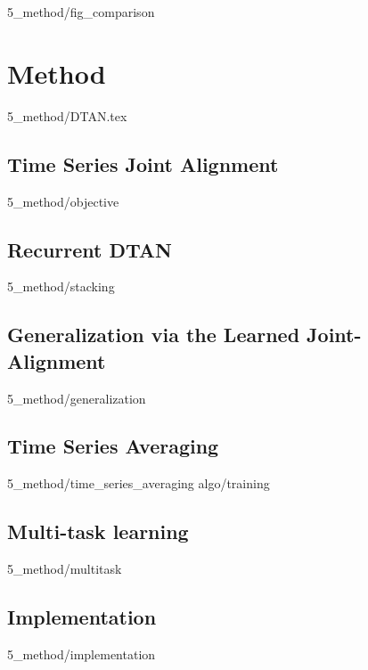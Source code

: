 {5_method/fig_comparison}
\section{Method}\label{Sec:Method}
{5_method/DTAN.tex}
\subsection{Time Series Joint Alignment}\label{Subsec:Method:objective:function}
{5_method/objective}

\subsection{Recurrent DTAN}\label{Subsec:Method:RNN}
{5_method/stacking}
\subsection{Generalization via the Learned Joint-Alignment}\label{Subsec:Method:Generalization}
{5_method/generalization}

\subsection{Time Series Averaging}\label{Subsec:Method:Averaging}
{5_method/time_series_averaging}
{algo/training}

\subsection{Multi-task learning}\label{Subsec:Method:Multitask}
{5_method/multitask}


\subsection{Implementation}\label{Subsec:Method:Implementation}
{5_method/implementation} 



